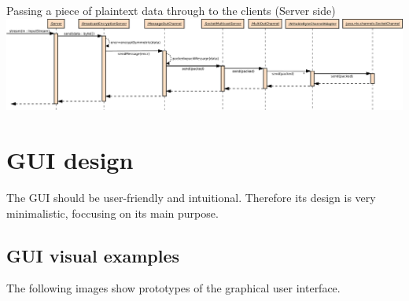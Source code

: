 \documentclass[a4paper,10pt]{scrartcl}
\begin{document}
\begin{landscape}
\begin{illustration}{Passing a piece of plaintext data through to the clients (Server side)}
\includegraphics [width=700px] {figures/sequence_diagram_comm1_server/output.pdf}
\end{illustration}
\end{landscape}

\section{GUI design}
The GUI should be user-friendly and intuitional. Therefore its design is very minimalistic, foccusing on its main purpose. 

\subsection{GUI visual examples}
The following images show prototypes of the graphical user interface.
\end{document}
